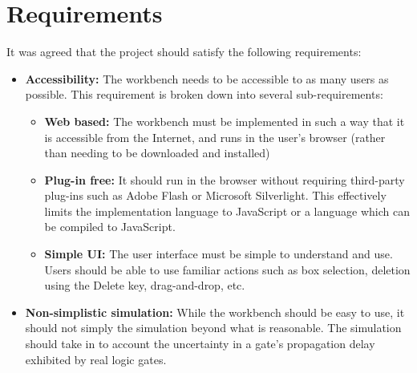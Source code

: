 \chapter{Requirements}
It was agreed that the project should satisfy the following requirements:

\begin{itemize}
	\item \textbf{Accessibility:} The workbench needs to be accessible to as many users as possible. This requirement is broken down into several sub-requirements:
	
		\begin{itemize}
			\item \textbf{Web based:} The workbench must be implemented in such a way that it is accessible from the Internet, and runs in the user's browser (rather than needing to be downloaded and installed) 
			
			\item \textbf{Plug-in free:} It should run in the browser without requiring third-party plug-ins such as Adobe Flash or Microsoft Silverlight. This effectively limits the implementation language to JavaScript or a language which can be compiled to JavaScript.
			
			\item \textbf{Simple UI:} The user interface must be simple to understand and use. Users should be able to use familiar actions such as box selection, deletion using the Delete key, drag-and-drop, etc.
		\end{itemize}
	
	\item \textbf{Non-simplistic simulation:} While the workbench should be easy to use, it should not simply the simulation beyond what is reasonable. The simulation should take in to account the uncertainty in a gate's propagation delay exhibited by real logic gates.
\end{itemize}

